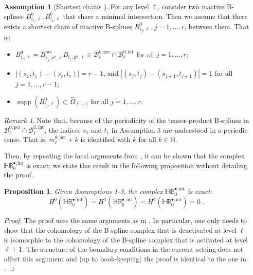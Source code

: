 \documentclass[10pt]{article}
\newcommand{\NN}{{\mathbb{N}}}
\DeclareMathOperator{\supp}{supp}
\newcommand{\suppwp}[1]{\supp{\left(#1\right)}}
\newcommand{\basis}[1]{\mathcal{#1}}
\newcommand{\vSpace}[1]{\mathbb{#1}}
\newcommand{\tpDomain}{\widehat{\Omega}}
\newcommand{\cU}{\theta}
\newcommand{\cV}{\rho}
\newcommand{\degU}{p^\cU}
\newcommand{\degV}{p^\cV}
\newcommand{\bsp}{B}
\newcommand{\bspB}{\basis{\bsp}}
\newcommand{\per}{\mathrm{per}}
\newcommand{\pndofU}{m^{\cU,\per}}
\newcommand{\tint}{\mathrm{int}}
\newcommand{\hintComplexZ}{\vSpace{H\bsp}^{\bullet,\tint}_0}
\theoremstyle{plain}
\newtheorem{proposition}{Proposition}[section]
\theoremstyle{definition}
\newtheorem{assumption}{Assumption}
\theoremstyle{remark}
\newtheorem{remark}{Remark}[section]
\begin{document}
\begin{assumption}[Shortest chains \cite{Shepherd:2024}]\label{ass:shortest-chains}
	For any level $\ell$, consider two inactive B-splines $\bsp^{0}_{i_1,\ell}, \bsp^{0}_{i_r,\ell}$ that share a minimal intersection.
    Then we assume that there exists a shortest chain of inactive B-splines $\bsp^{0}_{i_j,\ell}$, $j=1,\ldots,r$, between them.
    That is:
    \begin{itemize}
        \item $\bsp^{0}_{i_j,\ell} = \bsp^\per_{s_j,\degU,\ell}\bsp_{t_j,\degV,\ell} \in \bspB^{0,\per}_{\ell} \cap \bspB^{0,\tint}_{\ell}$ for all $j=1,\ldots,r$;
        \item $|(s_1,t_1) - (s_{r},t_{r})| = r-1$, and
        $|(s_j,t_j) - (s_{j+1},t_{j+1})| = 1$ for all $j=1,\ldots,r-1$;
        
        \item $\suppwp{\bsp^{0}_{i_j,\ell}} \subset \tpDomain_{\ell+1}$ for all $j=1,\ldots,r$.
    \end{itemize}
\end{assumption}
\begin{remark}
    Note that, because of the periodicity of the tensor-product B-splines in $\bspB^{0,\per}_{\ell} \cap \bspB^{0,\tint}_{\ell}$, the indices $s_1$ and $t_1$ in Assumption 3 are understood in a periodic sense.
    That is, $\pndofU_\ell + k$ is identified with $k$ for all $k \in \NN$.
\end{remark}

Then, by repeating the local arguments from \cite{Shepherd:2024}, it can be shown that the complex $\hintComplexZ$ is exact; we state this result in the following proposition without detailing the proof.
\begin{proposition}
    Given Assumptions 1-3, the complex $\hintComplexZ$ is exact:
    \begin{equation*}
        H^0(\hintComplexZ) = H^1(\hintComplexZ) = H^2(\hintComplexZ) = 0\;.
    \end{equation*}
\end{proposition}
\begin{proof}
    The proof uses the same arguments as in \cite{Shepherd:2024}.
    In particular, one only needs to show that the cohomology of the B-spline complex that is deactivated at level $\ell$ is isomorphic to the cohomology of the B-spline complex that is activated at level $\ell+1$.
    The structure of the boundary conditions in the current setting does not affect this argument and (up to book-keeping) the proof is identical to the one in \cite{Shepherd:2024}.
\end{proof}
\end{document}
